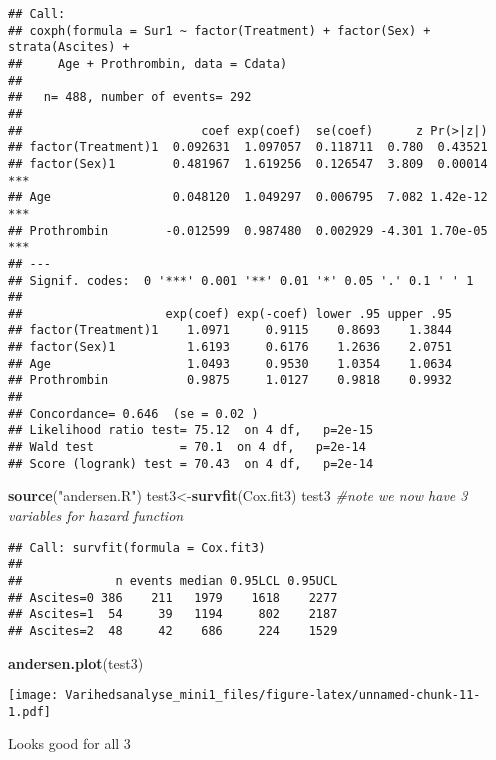 \documentclass[
]{article}
\newenvironment{Shaded}{\begin{snugshade}}{\end{snugshade}}
\newcommand{\CommentTok}[1]{\textcolor[rgb]{0.56,0.35,0.01}{\textit{#1}}}
\newcommand{\KeywordTok}[1]{\textcolor[rgb]{0.13,0.29,0.53}{\textbf{#1}}}
\newcommand{\NormalTok}[1]{#1}
\newcommand{\StringTok}[1]{\textcolor[rgb]{0.31,0.60,0.02}{#1}}
\begin{document}
\begin{verbatim}
## Call:
## coxph(formula = Sur1 ~ factor(Treatment) + factor(Sex) + strata(Ascites) + 
##     Age + Prothrombin, data = Cdata)
## 
##   n= 488, number of events= 292 
## 
##                         coef exp(coef)  se(coef)      z Pr(>|z|)    
## factor(Treatment)1  0.092631  1.097057  0.118711  0.780  0.43521    
## factor(Sex)1        0.481967  1.619256  0.126547  3.809  0.00014 ***
## Age                 0.048120  1.049297  0.006795  7.082 1.42e-12 ***
## Prothrombin        -0.012599  0.987480  0.002929 -4.301 1.70e-05 ***
## ---
## Signif. codes:  0 '***' 0.001 '**' 0.01 '*' 0.05 '.' 0.1 ' ' 1
## 
##                    exp(coef) exp(-coef) lower .95 upper .95
## factor(Treatment)1    1.0971     0.9115    0.8693    1.3844
## factor(Sex)1          1.6193     0.6176    1.2636    2.0751
## Age                   1.0493     0.9530    1.0354    1.0634
## Prothrombin           0.9875     1.0127    0.9818    0.9932
## 
## Concordance= 0.646  (se = 0.02 )
## Likelihood ratio test= 75.12  on 4 df,   p=2e-15
## Wald test            = 70.1  on 4 df,   p=2e-14
## Score (logrank) test = 70.43  on 4 df,   p=2e-14
\end{verbatim}

\begin{Shaded}
\begin{Highlighting}[]
\KeywordTok{source}\NormalTok{(}\StringTok{"andersen.R"}\NormalTok{)}
\NormalTok{test3<-}\KeywordTok{survfit}\NormalTok{(Cox.fit3)}
\NormalTok{test3 }\CommentTok{#note we now have 3 variables for hazard function}
\end{Highlighting}
\end{Shaded}

\begin{verbatim}
## Call: survfit(formula = Cox.fit3)
## 
##             n events median 0.95LCL 0.95UCL
## Ascites=0 386    211   1979    1618    2277
## Ascites=1  54     39   1194     802    2187
## Ascites=2  48     42    686     224    1529
\end{verbatim}

\begin{Shaded}
\begin{Highlighting}[]
\KeywordTok{andersen.plot}\NormalTok{(test3)}
\end{Highlighting}
\end{Shaded}

\texttt{[image: Varihedsanalyse\_mini1\_files/figure-latex/unnamed-chunk-11-1.pdf]}

Looks good for all 3
\end{document}
